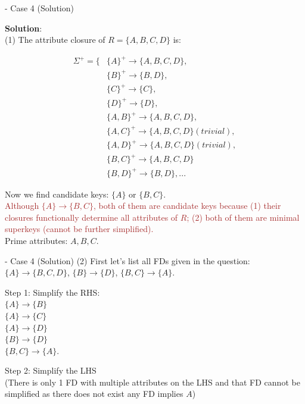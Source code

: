 \begin{frame}[fragile]{ - Case 4 (Solution)}
	
	\textbf{Solution}:\\
	(1) The attribute closure of $R = \{A, B, C, D\}$ is:\\
	\begin{scriptsize}
		\begin{align*} 
			\Sigma^{+} = \{&\{A\}^{+} \rightarrow \{A, B, C, D\},\\
			&\{B\}^{+} \rightarrow \{B, D\},\\
			&\{C\}^{+} \rightarrow \{C\},\\
			&\{D\}^{+} \rightarrow \{D\},\\
			&\{A, B\}^{+} \rightarrow \{A, B, C, D\},\\
			&\{A, C\}^{+} \rightarrow \{A, B, C, D\} (trivial),\\
			&\{A, D\}^{+} \rightarrow \{A, B, C, D\} (trivial),\\
			&\{B, C\}^{+} \rightarrow \{A, B, C, D\}\\
			&\{B, D\}^{+} \rightarrow \{B, D\}, ...
		\end{align*}
	\end{scriptsize}\vspace{-15pt}
	
	Now we find candidate keys: $\{A\}$ or $\{B, C\}$.\\
	\textcolor{brown}{Although $\{A\}\rightarrow\{B, C\}$, both of them are candidate keys because (1) their closures functionally determine all attributes of $R$; (2) both of them are minimal superkeys (cannot be further simplified).}\\
	Prime attributes: $A, B, C$.
\end{frame}

\begin{frame}[fragile]{ - Case 4 (Solution)}
	(2) First let's list all FDs given in the question:\\\vspace{5pt}
	$\{A\} \rightarrow \{B,C,D\}$, 
	$\{B\} \rightarrow \{D\}$, 
	$\{B, C\} \rightarrow \{A\}$.\\\vspace{5pt}
	
	Step 1: Simplify the RHS:\\\vspace{5pt}
	$\{A\} \rightarrow \{B\}$\\
	$\{A\} \rightarrow \{C\}$\\
	$\{A\} \rightarrow \{D\}$\\
	$\{B\} \rightarrow \{D\}$\\
	$\{B, C\} \rightarrow \{A\}$.\\\vspace{5pt}
	
	Step 2: Simplify the LHS \\
	(There is only 1 FD with multiple attributes on the LHS and that FD cannot be simplified as there does not exist any FD implies $A$) \\\vspace{5pt}
	
\end{frame}

